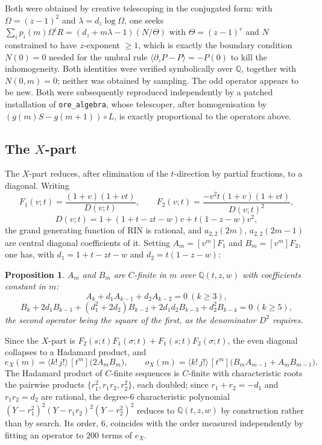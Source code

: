 \documentclass[11pt]{article}
\newtheorem{proposition}[theorem]{Proposition}
\theoremstyle{definition}
\begin{document}
Both were obtained by creative telescoping in the conjugated form: with
$\Omega=(z-1)^2$ and $\lambda=d_z\log\Omega$, one seeks
$\sum_i p_i(m)\Omega^i R=(d_z+m\lambda-1)(N/\Theta)$ with
$\Theta=(z-1)^{e}$ and $N$ constrained to have $z$-exponent $\ge1$, which is
exactly the boundary condition $N(0)=0$ needed for the umbral rule
$\langle\partial_zP-P\rangle=-P(0)$ to kill the inhomogeneity. Both identities
were verified symbolically over $\mathbb{Q}$, together with $N(0,m)=0$; neither
was obtained by sampling. The odd operator appears to be new. Both were
subsequently reproduced independently by a patched installation of
\texttt{ore\_algebra}, whose telescoper, after homogenisation by
$(g(m)S-g(m+1))\circ L$, is exactly proportional to the operators above.

\subsection{The $X$-part}

The $X$-part reduces, after elimination of the $t$-direction by partial
fractions, to a diagonal. Writing
\[
  F_1(v;t)=\frac{(1+v)(1+vt)}{D(v;t)},\qquad
  F_2(v;t)=\frac{-v^{2}t(1+v)(1+vt)}{D(v;t)^{2}},
\]
\[
  D(v;t)=1+(1+t-zt-w)v+t(1-z-w)v^{2},
\]
the grand generating function of $\mathrm{RIN}$ is rational, and $a_{2,2}(2m)$,
$a_{2,2}(2m-1)$ are central diagonal coefficients of it. Setting
$A_m=[v^{m}]F_1$ and $B_m=[v^{m}]F_2$, one has, with
$d_1=1+t-zt-w$ and $d_2=t(1-z-w)$:

\begin{proposition}\label{prop:cfinite}
$A_m$ and $B_m$ are $C$-finite in $m$ over $\mathbb{Q}(t,z,w)$ with
coefficients \emph{constant} in $m$:
\[
  A_k+d_1A_{k-1}+d_2A_{k-2}=0\ (k\ge3),
\]
\[
  B_k+2d_1B_{k-1}+(d_1^{2}+2d_2)B_{k-2}+2d_1d_2B_{k-3}+d_2^{2}B_{k-4}=0\ (k\ge5),
\]
the second operator being the square of the first, as the denominator $D^{2}$
requires.
\end{proposition}

Since the $X$-part is $F_2(s;t)F_1(\sigma;t)+F_1(s;t)F_2(\sigma;t)$, the even
diagonal collapses to a Hadamard product, and
\begin{equation}\label{eq:eX}
  e_X(m)=\langle k!\,j!\rangle\,[t^{m}]\bigl(2A_mB_m\bigr),
  \qquad
  o_X(m)=\langle k!\,j!\rangle\,[t^{m}]\bigl(B_mA_{m-1}+A_mB_{m-1}\bigr).
\end{equation}
The Hadamard product of $C$-finite sequences is $C$-finite with characteristic
roots the pairwise products $\{r_1^{2},r_1r_2,r_2^{2}\}$, each doubled; since
$r_1+r_2=-d_1$ and $r_1r_2=d_2$ are rational, the degree-$6$ characteristic
polynomial $(Y-r_1^{2})^{2}(Y-r_1r_2)^{2}(Y-r_2^{2})^{2}$ reduces to
$\mathbb{Q}(t,z,w)$ by construction rather than by search. Its order, $6$,
coincides with the order measured independently by fitting an operator to
$200$ terms of $e_X$.
\end{document}
